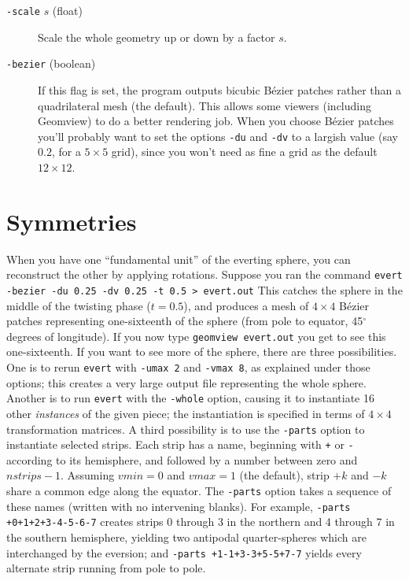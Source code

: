 \begin{description}
\item[{\tt-scale} $s$ (float)]
Scale the whole geometry up or down by a factor $s$.

\item[{\tt-bezier} (boolean)]
If this flag is set, the program outputs bicubic B\'ezier patches
rather than a quadrilateral mesh (the default).  This allows some viewers
(including Geomview) to do a better rendering job.  When you choose
B\'ezier patches you'll probably want to set the options {\tt-du} and
{\tt-dv} to a largish value (say $0.2$, for a $5\times5$ grid), since
you won't need as fine a grid as the default $12\times 12$.
\end{description}

\section*{Symmetries}

When you have one ``fundamental unit'' of the everting sphere, you can
reconstruct the other by applying rotations.  Suppose you ran the
command
%
\smallbreak
{\tt evert -bezier -du 0.25 -dv 0.25 -t 0.5 > evert.out}
\smallbreak\noindent
%
This catches the sphere in the middle of the twisting phase ($t=0.5$),
and produces a mesh of $4\times 4$ B\'ezier patches representing
one-sixteenth of the sphere (from pole to equator, 45$^\circ$ degrees
of longitude).  If you now type
%
\smallbreak
{\tt geomview evert.out}
\smallbreak\noindent
%
you get to see this one-sixteenth.  If you want to see more of the
sphere, there are three possibilities.  One is to rerun {\tt evert} with
{\tt-umax 2} and {\tt-vmax 8}, as explained under those options; this
creates a very large output file representing the whole sphere.
Another is to run {\tt evert} with the {\tt -whole} option, causing it
to instantiate 16 other {\it instances} of the given piece; the instantiation
is specified in terms of $4\times4$ transformation matrices.
A third possibility is to use the {\tt -parts}
option to instantiate selected strips.  Each strip has a name, beginning with
{\tt +} or {\tt -} according to its hemisphere, and followed by a number
between zero and $nstrips-1$.  Assuming $vmin=0$ and $vmax=1$
(the default), strip $+k$ and $-k$ share a common edge along the equator.
The {\tt -parts} option takes a sequence of these names (written with no
intervening blanks).   For example, {\tt -parts +0+1+2+3-4-5-6-7} creates
strips 0 through 3 in the northern and 4 through 7 in the southern hemisphere,
yielding two antipodal quarter-spheres which are interchanged by the eversion;
and {\tt -parts +1-1+3-3+5-5+7-7} yields every alternate strip running from
pole to pole.



